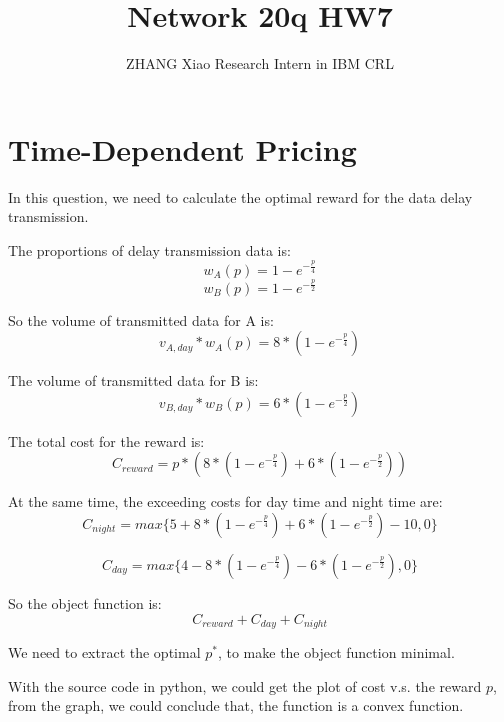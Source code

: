 \documentclass[12pt,a4paper]{article}
\author{ZHANG Xiao Research Intern in IBM CRL}
\title{Network 20q HW7}
\begin{document}
\maketitle
\pagebreak

\section{Time-Dependent Pricing}
In this question, we need to calculate the optimal reward for the data delay transmission.

The proportions of delay transmission data is:
\begin{equation}
w_A(p) = 1 - e^{-\frac{p}{4}}
\end{equation}
\begin{equation}
w_B(p) = 1 - e^{-\frac{p}{2}}
\end{equation}

So the volume of transmitted data for A is:
\begin{equation}
v_{A,day}*w_A(p) = 8*(1 - e^{-\frac{p}{4}})
\end{equation}

The volume of transmitted data for B is:
\begin{equation}
v_{B,day}*w_B(p) = 6*(1 - e^{-\frac{p}{2}})
\end{equation}

The total cost for the reward is:
\begin{equation}
C_{reward} = p*(8*(1 - e^{-\frac{p}{4}}) +  6*(1 - e^{-\frac{p}{2}}) )
\end{equation}

At the same time, the exceeding costs for day time and night time are:
\begin{equation}
C_{night} = max\{5+8*(1 - e^{-\frac{p}{4}}) + 6*(1 - e^{-\frac{p}{2}}) - 10, 0\}
\end{equation}

\begin{equation}
C_{day} = max\{4-8*(1 - e^{-\frac{p}{4}}) - 6*(1 - e^{-\frac{p}{2}}) , 0\}
\end{equation}

So the object function is:
\begin{equation}
C_{reward} + C_{day} + C_{night}
\end{equation}

We need to extract the optimal $p^{*}$, to make the object function minimal.

With the source code in python, we could get the plot of cost v.s. the reward $p$, from the graph, we could conclude that, the function is a convex function.
\end{document}
